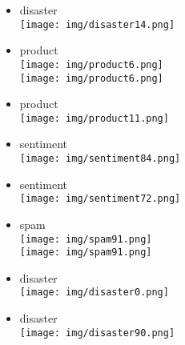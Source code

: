 \documentclass{article}
\theoremstyle{definition}
\theoremstyle{remark}
\begin{document}
\begin{landscape}
\newpage

\begin{itemize}
    \item disaster\\\texttt{[image: img/disaster14.png]}
    \item product\\\texttt{[image: img/product6.png]}\\
        \texttt{[image: img/product6.png]}
    \item product\\\texttt{[image: img/product11.png]}
    \item sentiment\\\texttt{[image: img/sentiment84.png]}
    \item sentiment\\\texttt{[image: img/sentiment72.png]}
    \item spam\\\texttt{[image: img/spam91.png]}\\
        \texttt{[image: img/spam91.png]}
\end{itemize}

\newpage

\begin{itemize}
    \item disaster\\\texttt{[image: img/disaster0.png]}
    \item disaster\\\texttt{[image: img/disaster90.png]}
\end{itemize}

\newpage


\end{landscape}
\end{document}

